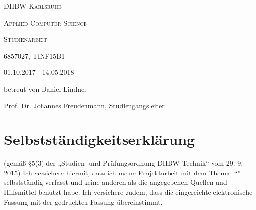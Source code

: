 \makeatletter
\begin{titlepage}
\centering
	{\scshape\LARGE DHBW Karlsruhe \par}
	{\scshape Applied Computer Science \par}
	\vspace{1cm}
	{\scshape\Large Studienarbeit\par}
	\vspace{1.5cm}
	{\huge\textbf{\@title} \par}
	\vspace{2cm}
	{\Large \@author \par}
	{\Large 6857027, TINF15B1 \par}
	\vspace{6cm}
	
	{\scshape
	01.10.2017 - 14.05.2018\par
	betreut von Daniel Lindner \par 
	Prof. Dr. Johannes Freudenmann, Studiengangsleiter}

\end{titlepage}

\section*{Selbstständigkeitserklärung}
(gemäß §5(3) der „Studien- und Prüfungsordnung DHBW Technik“ vom 29. 9. 2015)
Ich versichere hiermit, dass ich meine Projektarbeit mit dem Thema: "`\@title"' selbstständig verfasst und keine anderen als die angegebenen Quellen und Hilfsmittel benutzt habe. Ich versichere zudem, dass die eingereichte elektronische Fassung mit der gedruckten Fassung übereinstimmt.

\vspace{2 cm}
